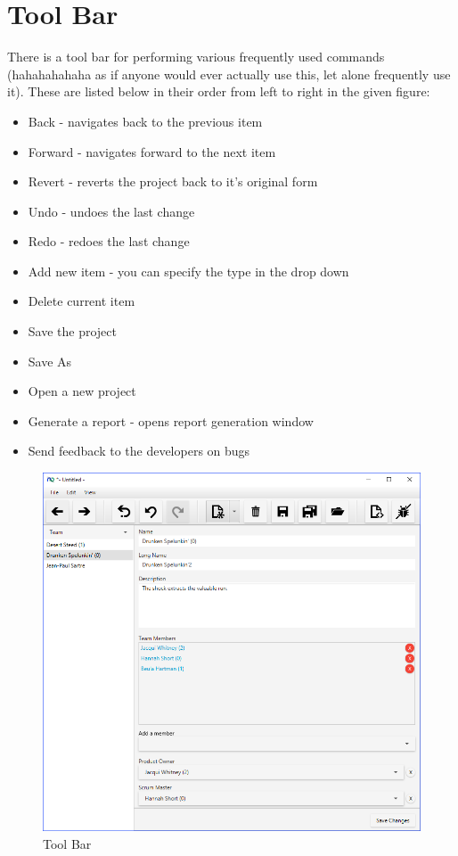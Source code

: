 \section{Tool Bar}

There is a tool bar for performing various frequently used commands (hahahahahaha as if anyone would ever actually use this, let alone frequently use it). These are listed below in their order from left to right in the given figure:

\begin{itemize}
\item Back - navigates back to the previous item
\item Forward - navigates forward to the next item
\item Revert - reverts the project back to it's original form
\item Undo - undoes the last change
\item Redo - redoes the last change
\item Add new item - you can specify the type in the drop down
\item Delete current item
\item Save the project
\item Save As
\item Open a new project
\item Generate a report - opens report generation window
\item Send feedback to the developers on bugs
\end{itemize}

\begin{figure}[H]
\centering
\includegraphics[width=\textwidth]{images/screenshots/toolbar.PNG}
\caption{Tool Bar}
\label{fig:new_project}
\end{figure}

